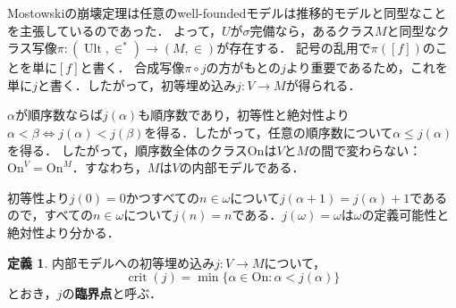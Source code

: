 \documentclass[uplatex]{jsarticle}
\newcommand{\Ordinals}{\mathrm{On}}
\newcommand{\crit}{\operatorname{crit}}
\newcommand{\Ult}{\operatorname{Ult}}
\theoremstyle{definition}
\newtheorem{defi}[thm]{定義}
\begin{document}
	Mostowskiの崩壊定理は任意のwell-foundedモデルは推移的モデルと同型なことを主張しているのであった．
	よって，$U$が$\sigma$完備なら，あるクラス$M$と同型なクラス写像$\pi \colon (\Ult, \in^*) \to (M, \in)$が存在する．
	記号の乱用で$\pi([f])$のことを単に$[f]$と書く．
	合成写像$\pi \circ j$の方がもとの$j$より重要であるため，これを単に$j$と書く．したがって，初等埋め込み$j \colon V \to M$が得られる．
	
	$\alpha$が順序数ならば$j(\alpha)$も順序数であり，初等性と絶対性より$\alpha < \beta \iff j(\alpha) < j(\beta)$を得る．したがって，任意の順序数について$\alpha \le j(\alpha)$を得る．
	したがって，順序数全体のクラス$\Ordinals$は$V$と$M$の間で変わらない：$\Ordinals^V = \Ordinals^M$．すなわち，$M$は$V$の内部モデルである．
	
	初等性より$j(0) = 0$かつすべての$n \in \omega$について$j(\alpha+1) = j(\alpha)+1$であるので，すべての$n \in \omega$について$j(n) = n$である．$j(\omega) = \omega$は$\omega$の定義可能性と絶対性より分かる．
	
	\begin{defi}
		内部モデルへの初等埋め込み$j \colon V \to M$について，
		\[
		\crit(j) = \min \{ \alpha \in \Ordinals : \alpha < j(\alpha) \}
		\]
		とおき，$j$の\textbf{臨界点}と呼ぶ．
	\end{defi}
	
\end{document}
